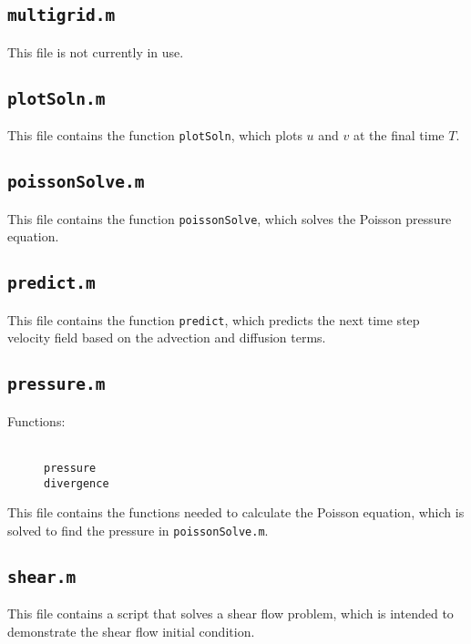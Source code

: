 \documentclass[12pt]{article}
\begin{document}
\subsection{\texttt{multigrid.m}}
This file is not currently in use.

\subsection{\texttt{plotSoln.m}}
This file contains the function \texttt{plotSoln}, which plots $u$ and $v$ at the final time $T$.

\subsection{\texttt{poissonSolve.m}}
This file contains the function \texttt{poissonSolve}, which solves the Poisson pressure equation.

\subsection{\texttt{predict.m}}
This file contains the function \texttt{predict}, which predicts the next time step velocity field based on the advection and diffusion terms.

\subsection{\texttt{pressure.m}}
\begin{description}
\item[Functions:] \hfill \\ \texttt{pressure} \\ \texttt{divergence} 
\end{description}
This file contains the functions needed to calculate the Poisson equation, which is solved to find the pressure in \texttt{poissonSolve.m}.

\subsection{\texttt{shear.m}}
This file contains a script that solves a shear flow problem, which is intended to demonstrate the shear flow initial condition.
\end{document}
